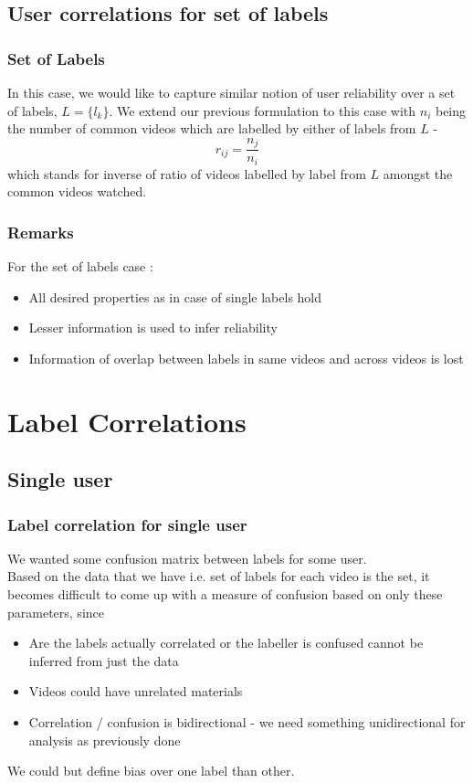 \documentclass{beamer}
\begin{document}
\subsection{User correlations for set of labels}

\begin{frame}
\frametitle{Set of Labels}
In this case, we would like to capture similar notion of user reliability over a set of labels, $L = \{l_k\}$. We extend our previous formulation to this case with $n_i$ being the number of common videos which are labelled by either of labels from $L$ - 
\begin{equation}
  r_{ij} = \frac{n_j}{n_i}
\end{equation}
which stands for inverse of ratio of videos labelled by label from $L$ amongst the common videos watched.\\
\end{frame}

\begin{frame}
\frametitle{Remarks}
For the set of labels case :
\begin{itemize}
  \item All desired properties as in case of single labels hold
  \item Lesser information is used to infer reliability
  \item Information of overlap between labels in same videos and across videos is lost
\end{itemize}
\end{frame}


\section{Label Correlations}

\subsection{Single user}

\begin{frame}
\frametitle{Label correlation for single user}
We wanted some confusion matrix between labels for some user. \\
Based on the data that we have i.e. set of labels for each video is the set, it becomes difficult to come up with a measure of confusion based on only these parameters, since 
\begin{itemize}
  \item Are the labels actually correlated or the labeller is confused cannot be inferred from just the data
  \item Videos could have unrelated materials
  \item Correlation / confusion is bidirectional - we need something unidirectional for analysis as previously done
\end{itemize}
We could but define bias over one label than other. 
\end{frame}
\end{document}

